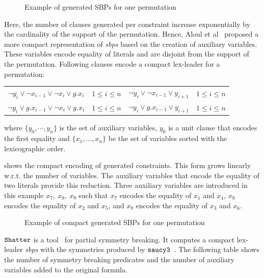 \begin{figure}[!htbp]
  
  \caption{Example of generated SBPs for one permutation}
  \label{fig:esbp_gen}
 \end{figure}
Here, the number of clauses generated per constraint increase exponentially by the 
cardinality of the support  of the permutation. Hence, Aloul et al~\cite{aloul06} proposed a more compact representation of \textit{sbps} based on the creation of auxiliary variables.  
These variables encode equality of literals and are disjoint from the support of the permutation.
Following clauses encode a compact lex-leader for a permutation:
 
\begin{center}
\begin{tabular}{cc|cc}
 $\neg y_i \lor \neg x_{i-1} \lor \neg x_i \lor g.x_i$ & $1 \leq i \leq n$ & $ \neg y_i \lor \neg x_{i-1} \lor y_{i+1}$ & $1 \leq i \leq n$ \\
 $\neg y_i \lor  g.x_{i-1} \lor \neg x_i \lor g.x_i$ & $1 \leq i \leq n$ & $ \neg y_i \lor g.x_{i-1} \lor  y_{i+1}$ & $1 \leq i \leq n$ \\
 
\end{tabular}
\end{center}
where $\{y_0,\cdots, y_{n} \}$ is the set of auxiliary variables, $y_0$ is a unit clause that encodes the first equality and $\{x_1,...,x_n\}$ be the set of variables sorted with the lexicographic order.

 shows the compact encoding of generated constraints. This form grows linearly w.r.t. the number of variables.
The auxiliary variables that encode the equality of two literals provide this reduction. 
Three auxiliary variables are introduced in this example $x_7,\ x_8,\ x_9$ such that $x_7$ encodes the equality of $x_1$ and $x_4$, $x_8$ encodes the equality of $x_2$ and $x_5$, and $x_9$ encodes the equality of $x_3$ and $x_6$.
 \begin{figure}[!htbp]
 
 \caption{Example of compact generated SBPs for one permutation}
 \label{fig:esbp_compact_gen}
\end{figure}
$\texttt{Shatter}$ is a tool~\cite{aloul06} for partial symmetry breaking.
It computes a compact lex-leader \textit{sbps} with the symmetries produced by $\texttt{saucy3}$~\cite{katebi2010symmetry}.
The following table shows the number of symmetry breaking predicates and the
number of auxiliary variables added to the original formula.


